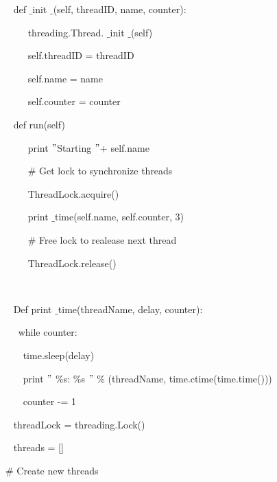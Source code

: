 \documentclass [12pt,a4paper,notitlepage,oneside,bahasa]{article}
\begin{document}
\noindent 
{\fontsize{10pt}{10pt}\selectfont ~ def $  \_  $init $  \_  $(self, threadID, name, counter):} \par
\noindent 
{\fontsize{10pt}{10pt}\selectfont ~~~~ threading.Thread. $  \_  $init $  \_  $(self)} \par
\noindent 
{\fontsize{10pt}{10pt}\selectfont ~~~~ self.threadID = threadID} \par
\noindent 
{\fontsize{10pt}{10pt}\selectfont ~~~~ self.name = name} \par
\noindent 
{\fontsize{10pt}{10pt}\selectfont ~~~~ self.counter = counter} \par
\noindent 
{\fontsize{10pt}{10pt}\selectfont ~ def run(self)} \par
\noindent 
{\fontsize{10pt}{10pt}\selectfont ~~~~ print  $ " $Starting  $ " $+ self.name} \par
\noindent 
{\fontsize{10pt}{10pt}\selectfont ~~~~  $  \#  $ Get lock to synchronize threads} \par
\noindent 
{\fontsize{10pt}{10pt}\selectfont ~~~~ ThreadLock.acquire()} \par
\noindent 
{\fontsize{10pt}{10pt}\selectfont ~~~~ print $  \_  $time(self.name, self.counter, 3)} \par
\noindent 
{\fontsize{10pt}{10pt}\selectfont ~~~~  $  \#  $ Free lock to realease next thread} \par
\noindent 
{\fontsize{10pt}{10pt}\selectfont ~~~~ ThreadLock.release()} \par
\noindent 
{\fontsize{10pt}{10pt}\selectfont ~ } \par
\noindent 
{\fontsize{10pt}{10pt}\selectfont ~ Def print $  \_  $time(threadName, delay, counter):} \par
\noindent 
{\fontsize{10pt}{10pt}\selectfont ~~ while counter:} \par
\noindent 
{\fontsize{10pt}{10pt}\selectfont ~~~ time.sleep(delay)} \par
\noindent 
{\fontsize{10pt}{10pt}\selectfont ~~~ print  $ " $ $  \%  $s:  $  \%  $s $ " $  $  \%  $ (threadName, time.ctime(time.time()))} \par
\noindent 
{\fontsize{10pt}{10pt}\selectfont ~~~ counter -= 1} \par
\noindent 
{\fontsize{10pt}{10pt}\selectfont ~ threadLock = threading.Lock()} \par
\noindent 
{\fontsize{10pt}{10pt}\selectfont ~ threads = []} \par
\vspace{10pt}
\noindent 
{\fontsize{10pt}{10pt}\selectfont  $  \#  $ Create new threads} \par
\end{document}
